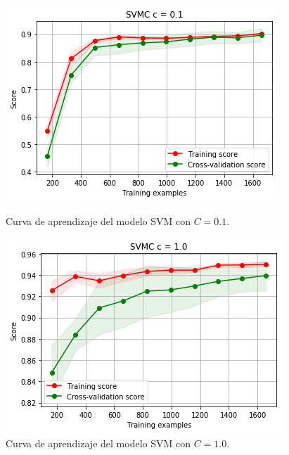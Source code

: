 \documentclass[11pt,a4paper]{article}
\begin{document}
\begin{figure}[H]
\centering
\begin{minipage}{.5\textwidth}
    \centering
    \includegraphics[scale=0.45]{img/lc-svm-c-01.png}
    \caption{Curva de aprendizaje del modelo SVM con $C = 0.1$.}
    \label{fig:lc-svm-c-01}
\end{minipage}%
\begin{minipage}{.5\textwidth}
    \centering
    \includegraphics[scale=0.45]{img/lc-svm-c-1.png}
    \caption{Curva de aprendizaje del modelo SVM con $C=1.0$.}
    \label{fig:lc-svm-c-1}
\end{minipage}
\end{figure}
\end{document}
